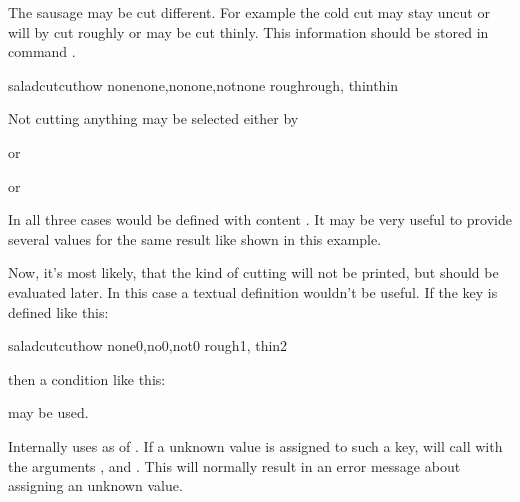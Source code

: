 \begin{Example}
  The sausage may be cut different. For example the cold cut may stay uncut or
  will by cut roughly or may be cut thinly. This information should be stored
  in command .
\begin{lstcode}
                     {saladcut}{cuthow}{%
                       {none}{none},{no}{none},{not}{none}%
                       {rough}{rough},%
                       {thin}{thin}%
                     }
\end{lstcode}
  Not cutting anything may be selected either by
\begin{lstcode}
\end{lstcode}
  or
\begin{lstcode}
\end{lstcode}
  or
\begin{lstcode}
\end{lstcode}
  In all three cases  would be defined with content
  . It may be very useful to provide several values for the same
  result like shown in this example.

  Now, it's most likely, that the kind of cutting will not be printed, but
  should be evaluated later. In this case a textual definition wouldn't be
  useful. If the key is defined like this:
\begin{lstcode}
                     {saladcut}{cuthow}{%
                       {none}{0},{no}{0},{not}{0}%
                       {rough}{1},%
                       {thin}{2}%
                     }
\end{lstcode}
  then a condition like this:
\begin{lstcode}
  \ifcase\cuthow
  \or
  \else
  \fi
\end{lstcode}
  may be used.
\end{Example}
Internally  uses  as
 of . If a unknown value is assigned to
such a key,  will call 
with the arguments ,  and . This will
normally result in an error message about assigning an unknown value.
%
%
%


